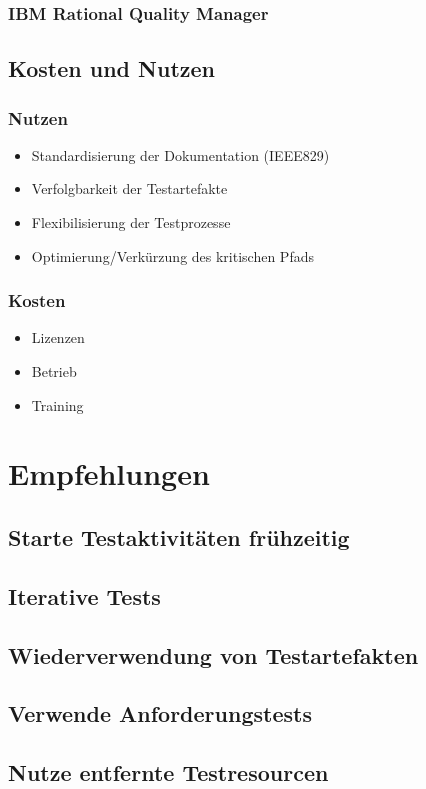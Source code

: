 \subsection{IBM Rational Quality Manager}
\section{Kosten und Nutzen}
\subsection{Nutzen}
\begin{itemize}
	\item Standardisierung der Dokumentation (IEEE829)
	\item Verfolgbarkeit der Testartefakte
	\item Flexibilisierung der Testprozesse
	\item Optimierung/Verkürzung des kritischen Pfads
\end{itemize}
\subsection{Kosten}
\begin{itemize}
	\item Lizenzen
	\item Betrieb
	\item Training
\end{itemize}

\chapter{Empfehlungen}
\section{Starte Testaktivit\"aten fr\"uhzeitig}
\section{Iterative Tests}
\section{Wiederverwendung von Testartefakten}
\section{Verwende Anforderungstests}
\section{Nutze entfernte Testresourcen}
